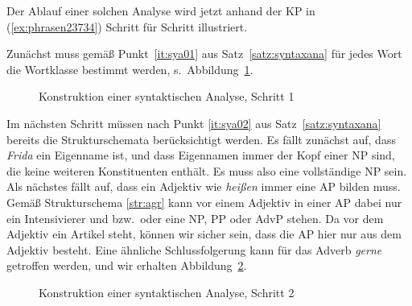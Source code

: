 Der Ablauf einer solchen Analyse wird jetzt anhand der KP in (\ref{ex:phrasen23734}) Schritt für Schritt illustriert.

\begin{exe}
\end{exe}

Zunächst muss gemäß Punkt~\ref{it:sya01} aus Satz~\ref{satz:syntaxana} für jedes Wort die Wortklasse bestimmt werden, s.\ Abbildung~\ref{fig:sya01}.

\begin{figure}
  \caption{Konstruktion einer syntaktischen Analyse, Schritt 1}
  \label{fig:sya01}
\end{figure}

Im nächsten Schritt müssen nach Punkt \ref{it:sya02} aus Satz~\ref{satz:syntaxana} bereits die Strukturschemata berücksichtigt werden.
Es fällt zunächst auf, dass \textit{Frida} ein Eigenname ist, und dass Eigennamen immer der Kopf einer NP sind, die keine weiteren Konstituenten enthält.
Es muss also eine vollständige NP sein.
Als nächstes fällt auf, dass ein Adjektiv wie \textit{heißen} immer eine AP bilden muss.
Gemäß Strukturschema \ref{str:agr} kann vor einem Adjektiv in einer AP dabei nur ein Intensivierer und bzw.\ oder eine NP, PP oder AdvP stehen.
Da vor dem Adjektiv ein Artikel steht, können wir sicher sein, dass die AP hier nur aus dem Adjektiv besteht.
Eine ähnliche Schlussfolgerung kann für das Adverb \textit{gerne} getroffen werden, und wir erhalten Abbildung~\ref{fig:sya02}.

\begin{figure}
  \caption{Konstruktion einer syntaktischen Analyse, Schritt 2}
  \label{fig:sya02}
\end{figure}


